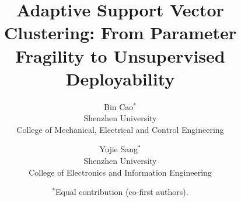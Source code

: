 \documentclass[10pt,twocolumn,letterpaper]{article}
\title{Adaptive Support Vector Clustering: From Parameter Fragility to Unsupervised Deployability}
\author{Bin Cao$^{*}$\\
Shenzhen University\\
College of Mechanical, Electrical and Control Engineering
\and
Yujie Sang$^{*}$\\
Shenzhen University\\
College of Electronics and Information Engineering\\
\and
$^{*}$Equal contribution (co-first authors).
}
\begin{document}
\maketitle







{\small}
\end{document}
